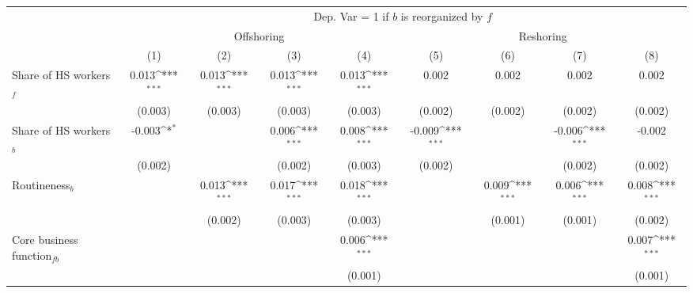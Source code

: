 \begin{table}[htbp] \footnotesize \centering
\def\sym#1{\ifmmode^{#1}\else\(^{#1}\)\fi}
\renewcommand{\arraystretch}{1}
\begin{tabular}{l*{8}{c}}
\toprule
&\multicolumn{8}{c}{Dep. Var = 1 if $ b $ is reorganized by $ f $} \\
\cmidrule(lr){2-9}
                &\multicolumn{4}{c}{Offshoring}                                             &\multicolumn{4}{c}{Reshoring}                                              \\\cmidrule(lr){2-5}\cmidrule(lr){6-9}
                &\multicolumn{1}{c}{(1)}         &\multicolumn{1}{c}{(2)}         &\multicolumn{1}{c}{(3)}         &\multicolumn{1}{c}{(4)}         &\multicolumn{1}{c}{(5)}         &\multicolumn{1}{c}{(6)}         &\multicolumn{1}{c}{(7)}         &\multicolumn{1}{c}{(8)}         \\
\midrule
Share of HS workers$ _f$&    0.013\sym{***}&    0.013\sym{***}&    0.013\sym{***}&    0.013\sym{***}&    0.002         &    0.002         &    0.002         &    0.002         \\
                &  (0.003)         &  (0.003)         &  (0.003)         &  (0.003)         &  (0.002)         &  (0.002)         &  (0.002)         &  (0.002)         \\
\addlinespace
Share of HS workers$ _b$&   -0.003\sym{*}  &                  &    0.006\sym{***}&    0.008\sym{***}&   -0.009\sym{***}&                  &   -0.006\sym{***}&   -0.002         \\
                &  (0.002)         &                  &  (0.002)         &  (0.003)         &  (0.002)         &                  &  (0.002)         &  (0.002)         \\
\addlinespace
Routineness$ _b$&                  &    0.013\sym{***}&    0.017\sym{***}&    0.018\sym{***}&                  &    0.009\sym{***}&    0.006\sym{***}&    0.008\sym{***}\\
                &                  &  (0.002)         &  (0.003)         &  (0.003)         &                  &  (0.001)         &  (0.001)         &  (0.002)         \\
\addlinespace
Core business function$ _{fb}$&                  &                  &                  &    0.006\sym{***}&                  &                  &                  &    0.007\sym{***}\\
                &                  &                  &                  &  (0.001)         &                  &                  &                  &  (0.001)         \\

\end{tabular}
\end{table}
